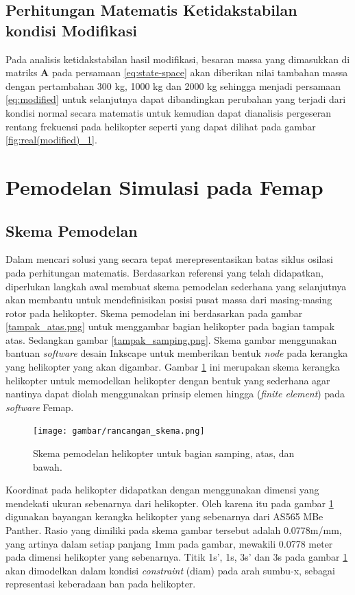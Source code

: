 \subsection{Perhitungan Matematis Ketidakstabilan kondisi Modifikasi}

Pada analisis ketidakstabilan hasil modifikasi, besaran massa yang dimasukkan di matriks \textbf{A} pada persamaan \ref{eq:state-space} akan diberikan nilai tambahan massa dengan pertambahan 300 kg, 1000 kg dan 2000 kg sehingga menjadi persamaan \ref{eq:modified} untuk selanjutnya dapat dibandingkan perubahan yang terjadi dari kondisi normal secara matematis untuk kemudian dapat dianalisis pergeseran rentang frekuensi pada helikopter seperti yang dapat dilihat pada gambar \ref{fig:real(modified)_1}.

\section{Pemodelan Simulasi pada Femap}
\label{sec:femap}

\subsection{Skema Pemodelan}
Dalam mencari solusi yang secara tepat merepresentasikan batas siklus osilasi pada perhitungan matematis. Berdasarkan referensi yang telah didapatkan, diperlukan langkah awal membuat skema pemodelan sederhana yang selanjutnya akan membantu untuk mendefinisikan posisi pusat massa dari masing-masing rotor pada helikopter. Skema pemodelan ini berdasarkan pada gambar \ref{tampak_atas.png} untuk menggambar bagian helikopter pada bagian tampak atas. Sedangkan gambar \ref{tampak_samping.png}. Skema gambar menggunakan bantuan \textit{software} desain Inkscape untuk memberikan bentuk \textit{node} pada kerangka yang helikopter yang akan digambar. Gambar \ref{fig:skema_model} ini merupakan skema kerangka helikopter untuk memodelkan helikopter dengan bentuk yang sederhana agar nantinya dapat diolah menggunakan prinsip elemen hingga (\textit{finite element}) pada \textit{software} Femap.

\begin{figure}[H]
	\centering
	\texttt{[image: gambar/rancangan\_skema.png]}
	\caption{Skema pemodelan helikopter untuk bagian samping, atas, dan bawah.}
	\label{fig:skema_model}
\end{figure}

Koordinat pada helikopter didapatkan dengan menggunakan dimensi yang mendekati ukuran sebenarnya dari helikopter. Oleh karena itu pada gambar \ref{fig:skema_model} digunakan bayangan kerangka helikopter yang sebenarnya dari AS565 MBe Panther. Rasio yang dimiliki pada skema gambar tersebut adalah 0.0778m/mm, yang artinya dalam setiap panjang 1mm pada gambar, mewakili 0.0778 meter pada dimensi helikopter yang sebenarnya. Titik 1s', 1s, 3s' dan 3s pada gambar \ref{fig:skema_model} akan dimodelkan dalam kondisi \textit{constraint} (diam) pada arah sumbu-x, sebagai representasi keberadaan ban pada helikopter. 

